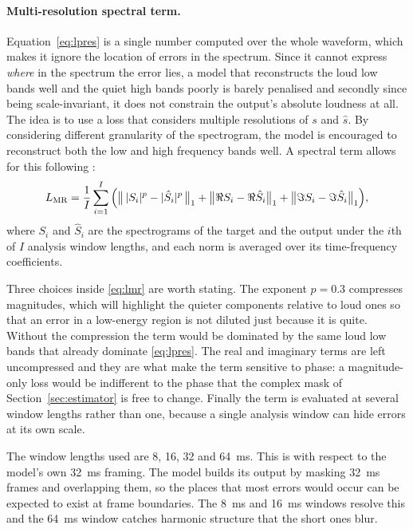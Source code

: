 \paragraph{Multi-resolution spectral term.}
Equation~\eqref{eq:lpres} is a single number computed over the whole waveform, which makes it ignore the location of errors in the spectrum. Since it cannot express \emph{where} in the spectrum the error lies, a model that reconstructs the loud low bands well and the quiet high bands poorly is barely penalised and secondly since being scale-invariant, it does not constrain the output's absolute loudness at all. The idea is to use a loss that considers multiple resolutions of $s$ and $\hat{s}$. By considering different granularity of the spectrogram, the model is encouraged to reconstruct both the low and high frequency bands well. A spectral term allows for this following \cite{yu2023high}:
\begin{equation}
L_\textup{MR} = \frac{1}{I} \sum_{i=1}^{I}
  \Big(
    \big\lVert\, |S_i|^{p} - |\hat{S}_i|^{p} \,\big\rVert_1
    + \big\lVert \Re S_i - \Re \hat{S}_i \big\rVert_1
    + \big\lVert \Im S_i - \Im \hat{S}_i \big\rVert_1
  \Big),
\label{eq:lmr}
\end{equation}
where $S_i$ and $\hat{S}_i$ are the spectrograms of the target and the output under the $i$th of $I$ analysis window lengths, and each norm is averaged over its time-frequency coefficients.

Three choices inside \eqref{eq:lmr} are worth stating. The exponent $p = 0.3$ compresses magnitudes, which will highlight the quieter components relative to loud ones so that an error in a low-energy region is not diluted just because it is quite. Without the compression the term would be dominated by the same loud low bands that already dominate \eqref{eq:lpres}. The real and imaginary terms are left uncompressed and they are what make the term sensitive to phase: a magnitude-only loss would be indifferent to the phase that the complex mask of Section~\ref{sec:estimator} is free to change. Finally the term is evaluated at several window lengths rather than one, because a single analysis window can hide errors at its own scale.

The window lengths used are \num{8}, \num{16}, \num{32} and \SI{64}{\ms}. This is with respect to the model's own \SI{32}{\ms} framing. The model builds its output by masking \SI{32}{\ms} frames and overlapping them, so the places that most errors would occur can be expected to exist at frame boundaries. The \SI{8}{\ms} and \SI{16}{\ms} windows resolve this and the \SI{64}{\ms} window catches harmonic structure that the short ones blur.

